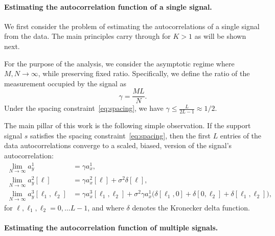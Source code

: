 \documentclass[english,11pt]{article}
\newcommand{\1}{\mathbf{1}}
\numberwithin{equation}{section}
\theoremstyle{plain}
\theoremstyle{definition}
\theoremstyle{remark}
\theoremstyle{plain}
\theoremstyle{remark}
\theoremstyle{plain}
\theoremstyle{plain}
\begin{document}
\paragraph{Estimating the autocorrelation function of a single signal.}

We first consider the problem of estimating the autocorrelations of a single signal from the data. 
The main principles carry through for $K>1$ as will be shown next.  

For the purpose of the analysis, we consider  the asymptotic regime where $M,N\to\infty$, while preserving fixed ratio. 
Specifically, we define the ratio of the measurement occupied by  the signal as
\begin{equation}
\gamma = \frac{M L}{N}.
\end{equation}
Under the spacing constraint~\eqref{eq:spacing}, we have $\gamma\leq\frac{L}{2L-1}\approx 1/2$.

The main pillar of this work is the following simple observation.
If the support signal $s$ satisfies the spacing constraint~\eqref{eq:spacing}, then the first $L$ entries of the data autocorrelations converge 
to a scaled, biased, version of the signal's autocorrelation:
\begin{align} 
\lim_{N\to\infty} a_y^1 & = \gamma a_{x}^1, \nonumber\\
\lim_{N\to\infty} a_y^2[\ell] & = \gamma a_{x}^2[\ell] +\sigma^2\delta[\ell], \label{eq:data_ac_k1} \\
\lim_{N\to\infty} a_y^3[\ell_1,\ell_2] & = \gamma a_{x}^3[\ell_1,\ell_2] + \sigma^2\gamma a_{x}^1 \big(\delta[\ell_1,0]+\delta[0,\ell_2]+\delta[\ell_1,\ell_2]\big), \nonumber
\end{align}
for $\ell,\ell_1,\ell_2=0,\ldots L-1$, and where $\delta$ denotes the Kronecker delta function. 

\paragraph{Estimating the autocorrelation function of multiple signals.}
\end{document}
